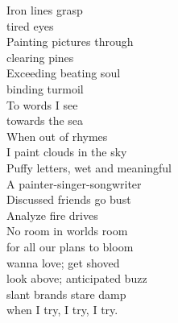 Iron lines grasp\\
tired eyes\\
Painting pictures through\\
clearing pines\\
Exceeding beating soul\\
binding turmoil\\
To words I see\\
towards the sea\\

When out of rhymes\\
I paint clouds in the sky\\
Puffy letters, wet and meaningful\\
A painter-singer-songwriter\\

Discussed friends go bust\\
Analyze fire drives\\
No room in worlds room\\
for all our plans to bloom\\
wanna love; get shoved\\
look above; anticipated buzz\\
slant brands stare damp\\
when I try, I try, I try.\\

